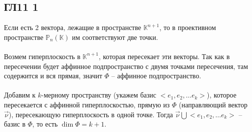\subsection*{ГЛ11 1}
Если есть 2 вектора, лежащие в пространстве $\mathbb{K}^{n+1}$, то в проективном пространстве $\mathbb{P}_n(\mathbb{K})$ им соответствуют две точки.\\
\\
Возмем гиперплоскость в $\mathbb{K}^{n+1}$, которая пересекает эти векторы. Так как в пересечении будет аффинное подпространство с двумя точками пересечения, там содержится и вся прямая, значит $\Phi$ -- аффинное подпространство.\\
\\
Добавим к $k$-мерному пространству (укажем базис $<e_1, e_2, \ldots e_k>$), которое пересекается с аффинной гиперплоскостью, прямую из $\Phi$ (направляющий вектор $\overrightarrow{\nu}$), пересекающую гиперплоскость в одной точке. Тогда $\overrightarrow{\nu} \bigcup <e_1, e_2, \ldots e_k>$ -- базис в $\Phi$, то есть $\operatorname{dim}\Phi = k+1$.